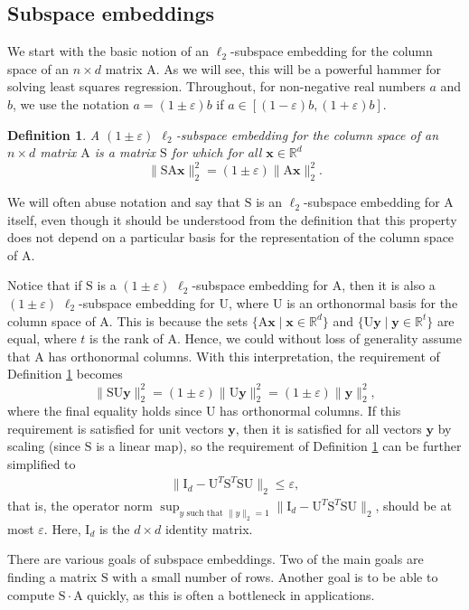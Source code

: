 \documentclass[11pt]{article}
\newtheorem{definition}[theorem]{Definition}
\newcommand{\mat}[1]{{\ensuremath{\bm{\mathrm{#1}}}}}
\def\matA{\mat{A}}
\def\matI{\mat{I}}
\def\matS{\mat{S}}
\def\matU{\mat{U}}
\def\x{{\mathbf x}}
\def\y{{\mathbf y}}
\newcommand{\eps}{\varepsilon}
\begin{document}
\subsection{Subspace embeddings}\label{sec:se}
We start with the basic notion of an $\ell_2$-subspace embedding for the column space of an $n \times d$ matrix $\matA$. 
As we will see, this will be a powerful hammer for solving least squares regression. 
Throughout, for non-negative real numbers $a$ and $b$, we use the notation $a = (1 \pm \eps)b$ if
$a \in [(1-\eps)b, (1+\eps)b]$. 
\begin{definition}\label{def:subspace}
A $(1 \pm \eps)$ $\ell_2$-subspace embedding for the column space of an 
$n \times d$ matrix $\matA$ 
is a matrix $\matS$ for which for all $\x \in \mathbb{R}^d$
$$\|\matS \matA \x\|_2^2 = (1 \pm \eps)\|\matA \x\|_2^2.$$
\end{definition}
We will often abuse notation and say that $\matS$ is an $\ell_2$-subspace embedding for $\matA$ itself, even though it should be understood from the definition that this property does not depend on a particular basis for the representation of the column space of $\matA$. 

Notice that if $\matS$ is a $(1 \pm \eps)$ $\ell_2$-subspace embedding for $\matA$, then it is also a
$(1 \pm \eps)$ $\ell_2$-subspace embedding for $\matU$, where $\matU$ is an orthonormal basis for the column
space of $\matA$. This is because the sets 
$\{\matA \x \mid \x \in \mathbb{R}^d\}$ and $\{\matU \y \mid \y \in \mathbb{R}^t\}$
are equal, where $t$ is the rank of $\matA$. 
Hence, we could without loss of generality assume that $\matA$ has orthonormal columns. With 
this interpretation, the requirement of Definition \ref{def:subspace} becomes
$$\|\matS \matU \y\|_2^2 = (1 \pm \eps) \|\matU \y\|_2^2 = (1 \pm \eps)\|\y\|_2^2,$$
where the final equality holds since $\matU$ has orthonormal columns. If this requirement is satisfied
for unit vectors $\y$, then it is satisfied for all vectors $\y$ by scaling (since $\matS$ is a linear
map), so the requirement
of Definition \ref{def:subspace} can be further simplified to
\begin{eqnarray}\label{eqn:operatorDiff}
\|\matI_{d} - \matU^T \matS^T \matS \matU\|_2 \leq \eps,
\end{eqnarray}
that is, the operator norm $\sup_{y \textrm{ such that }\|y\|_2 = 1} \|\matI_d - \matU^T\matS^T\matS \matU\|_2$, 
should be at most $\eps$. Here, $\matI_{d}$ is the $d \times d$ identity matrix. 

There are various goals of subspace embeddings. Two of the main goals are finding a matrix $\matS$ with a small
number of rows. Another goal is to be able to compute $\matS \cdot \matA$ quickly, as this is often a bottleneck
in applications. 
\end{document}

